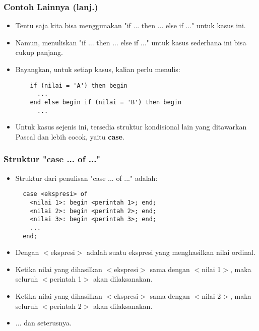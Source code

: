 \begin{frame}[fragile]
\frametitle{Contoh Lainnya (lanj.)}
\begin{itemize}
  \item Tentu saja kita bisa menggunakan "if ... then ... else if ..." untuk kasus ini.
  \item Namun, menuliskan "if ... then ... else if ..." untuk kasus sederhana ini bisa cukup panjang.
  \item Bayangkan, untuk setiap kasus, kalian perlu menulis:
  \begin{lstlisting}
    if (nilai = 'A') then begin
      ...
    end else begin if (nilai = 'B') then begin
      ...
  \end{lstlisting}
  \item Untuk kasus sejenis ini, tersedia struktur kondisional lain yang ditawarkan Pascal dan lebih cocok, yaitu \alert{\textbf{case}}.
\end{itemize}
\end{frame}

\begin{frame}[fragile]
\frametitle{Struktur "case ... of ..."}
\begin{itemize}
  \item Struktur dari penulisan "case ... of ..." adalah:
  \begin{lstlisting}
  case <ekspresi> of
    <nilai 1>: begin <perintah 1>; end;
    <nilai 2>: begin <perintah 2>; end;
    <nilai 3>: begin <perintah 3>; end;
    ...
  end;
  \end{lstlisting}

  \item Dengan $<$ekspresi$>$ adalah suatu ekspresi yang menghasilkan \alert{nilai ordinal}.
  \item Ketika nilai yang dihasilkan $<$ekspresi$>$ sama dengan $<$nilai 1$>$, maka seluruh $<$perintah 1$>$ akan dilaksanakan.
  \item Ketika nilai yang dihasilkan $<$ekspresi$>$ sama dengan $<$nilai 2$>$, maka seluruh $<$perintah 2$>$ akan dilaksanakan.
  \item ... dan seterusnya.
\end{itemize}
\end{frame}

